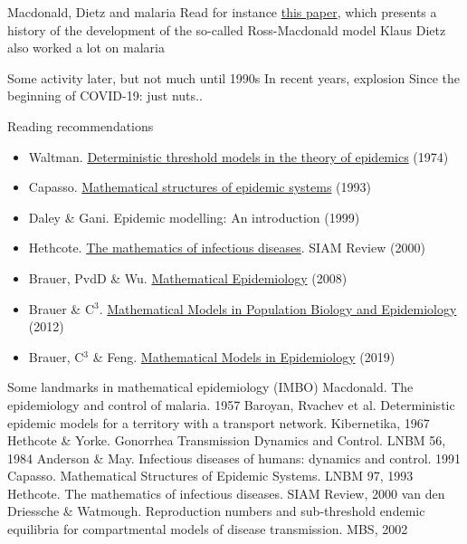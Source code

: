\documentclass[aspectratio=169]{beamer}\usepackage[]{graphicx}\usepackage[]{xcolor}
\begin{document}
\begin{frame}{Macdonald, Dietz and malaria}
\bbullet Read for instance \href{https://doi.org/10.1371/journal.ppat.1002588}{this paper}, which presents a history of the development of the so-called Ross-Macdonald model
\vfill
\bbullet Klaus Dietz also worked a lot on malaria
\end{frame}
    
  
\begin{frame}{Some activity later, but not much until 1990s}
\bbullet In recent years, explosion
\vfill
\bbullet Since the beginning of COVID-19: just nuts..
\end{frame}

\begin{frame}{Reading recommendations}
    \begin{itemize}
    \item Waltman. \href{https://doi.org/10.1007/978-3-642-80820-3}{Deterministic threshold models in the theory of epidemics} (1974)
    \nocite{waltman2013deterministic}
		\vfill
    \item Capasso. \href{https://doi.org/10.1007/978-3-540-70514-7}{Mathematical structures of epidemic systems} (1993)
    \nocite{capasso1993mathematical}
		\vfill
    \item Daley \& Gani. Epidemic modelling: An introduction (1999)
    \nocite{daley1999epidemic}
		\vfill
    \item Hethcote. \href{https://doi.org/10.1137/S0036144500371907}{The mathematics of infectious diseases}. SIAM Review (2000)
    \nocite{Hethcote2000}
		\vfill
    \item Brauer, PvdD \& Wu. \href{https://doi.org/10.1007/978-3-540-78911-6}{Mathematical Epidemiology} (2008)
    \nocite{brauer2008mathematical}
		\vfill
    \item Brauer \& C$^3$. \href{https://doi.org/10.1007/978-1-4614-1686-9}{Mathematical Models in Population Biology and Epidemiology} (2012)
    \nocite{brauer2012mathematical}
		\vfill
    \item Brauer, C$^3$ \& Feng. \href{https://doi.org/10.1007/978-1-4939-9828-9}{Mathematical Models in Epidemiology} (2019)
    \nocite{brauer2019mathematical}
    \end{itemize}
\end{frame}


\begin{frame}{Some landmarks in mathematical epidemiology (IMBO)}
\bbullet Macdonald. The epidemiology and control of malaria. 1957
\vfill
\bbullet Baroyan, Rvachev et al. Deterministic epidemic models for a territory with a transport network. Kibernetika, 1967
\vfill
\bbullet Hethcote \& Yorke. Gonorrhea Transmission Dynamics and Control. LNBM 56, 1984
\vfill
\bbullet Anderson \& May. Infectious diseases of humans: dynamics and control. 1991
\vfill
\bbullet Capasso. Mathematical Structures of Epidemic Systems. LNBM 97, 1993
\vfill
\bbullet Hethcote. The mathematics of infectious diseases. SIAM Review, 2000
\vfill
\bbullet van den Driessche \& Watmough. Reproduction numbers and sub-threshold endemic equilibria for compartmental models of disease transmission. MBS, 2002      
\end{frame}
\end{document}
